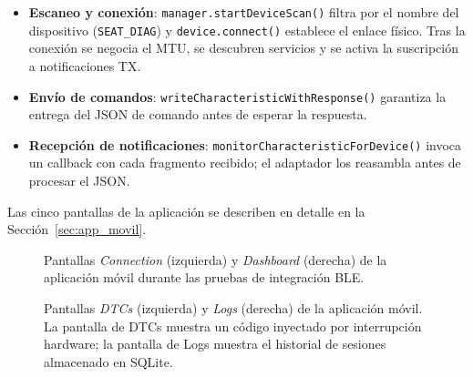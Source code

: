 \begin{itemize}
    \item \textbf{Escaneo y conexión}: \texttt{manager.startDeviceScan()} filtra por el nombre del dispositivo (\texttt{SEAT\_DIAG}) y \texttt{device.connect()} establece el enlace físico. Tras la conexión se negocia el MTU, se descubren servicios y se activa la suscripción a notificaciones TX.
    \item \textbf{Envío de comandos}: \texttt{writeCharacteristicWithResponse()} garantiza la entrega del JSON de comando antes de esperar la respuesta.
    \item \textbf{Recepción de notificaciones}: \texttt{monitorCharacteristicForDevice()} invoca un callback con cada fragmento recibido; el adaptador los reasambla antes de procesar el JSON.
\end{itemize}

Las cinco pantallas de la aplicación se describen en detalle en la Sección~\ref{sec:app_movil}.

\begin{figure}[!htbp]
\centering
\caption{Pantallas \textit{Connection} (izquierda) y \textit{Dashboard} (derecha) de la aplicación móvil durante las pruebas de integración BLE.}
\label{fig:fase4_app_dash}
\end{figure}

\begin{figure}[!htbp]
\centering
\caption{Pantallas \textit{DTCs} (izquierda) y \textit{Logs} (derecha) de la aplicación móvil. La pantalla de DTCs muestra un código inyectado por interrupción hardware; la pantalla de Logs muestra el historial de sesiones almacenado en SQLite.}
\label{fig:fase4_app_dtc_logs}
\end{figure}











